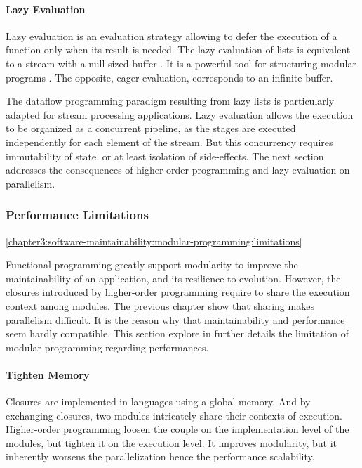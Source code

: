 \paragraph{Lazy Evaluation}

Lazy evaluation is an evaluation strategy allowing to defer the execution of a function only when its result is needed.
The lazy evaluation of lists is equivalent to a stream with a null-sized buffer \cite{VanRoy2003}.
It is a powerful tool for structuring modular programs \cite{Sussman1983}.
The opposite, eager evaluation, corresponds to an infinite buffer.

The dataflow programming paradigm resulting from lazy lists is particularly adapted for stream processing applications.
Lazy evaluation allows the execution to be organized as a concurrent pipeline, as the stages are executed independently for each element of the stream.
But this concurrency requires immutability of state, or at least isolation of side-effects.
The next section addresses the consequences of higher-order programming and lazy evaluation on parallelism.


\subsubsection{Performance Limitations} \ref{chapter3:software-maintainability:modular-programming:limitations}

Functional programming greatly support modularity to improve the maintainability of an application, and its resilience to evolution.
However, the closures introduced by higher-order programming require to share the execution context among modules.
The previous chapter show that sharing makes parallelism difficult.
It is the reason why that maintainability and performance seem hardly compatible.
This section explore in further details the limitation of modular programming regarding performances.

\paragraph{Tighten Memory}

Closures are implemented in languages using a global memory.
And by exchanging closures, two modules intricately share their contexts of execution.
Higher-order programming loosen the couple on the implementation level of the modules, but tighten it on the execution level.
It improves modularity, but it inherently worsens the parallelization hence the performance scalability.

